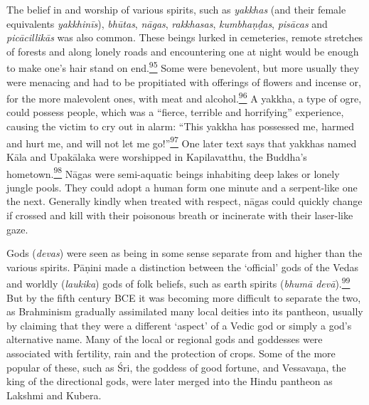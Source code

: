 The belief in and worship of various spirits, such as \emph{yakkhas}
(and their female equivalents \emph{yakkhinīs}), \emph{bhūtas},
\emph{nāgas}, \emph{rakkhasas}, \emph{kumbhaṇḍas}, \emph{pisācas} and
\emph{picācillikās} was also common. These beings lurked in cemeteries,
remote stretches of forests and along lonely roads and encountering one
at night would be enough to make one's hair stand on
end.\label{footprints_split_007.html_fnref95}\hyperref[footprints_split_024.htmlux5cux23fn95]{\textsuperscript{95}}
Some were benevolent, but more usually they were menacing and had to be
propitiated with offerings of flowers and incense or, for the more
malevolent ones, with meat and
alcohol.\label{footprints_split_007.html_fnref96}\hyperref[footprints_split_024.htmlux5cux23fn96]{\textsuperscript{96}}
A yakkha, a type of ogre, could possess people, which was a ``fierce,
terrible and horrifying'' experience, causing the victim to cry out in
alarm: ``This yakkha has possessed me, harmed and hurt me, and will not
let me
go!''\label{footprints_split_007.html_fnref97}\hyperref[footprints_split_024.htmlux5cux23fn97]{\textsuperscript{97}}
One later text says that yakkhas named Kāla and Upakālaka were
worshipped in Kapilavatthu, the Buddha's
hometown.\label{footprints_split_007.html_fnref98}\hyperref[footprints_split_024.htmlux5cux23fn98]{\textsuperscript{98}}
Nāgas were semi-aquatic beings inhabiting deep lakes or lonely jungle
pools. They could adopt a human form one minute and a serpent-like one
the next. Generally kindly when treated with respect, nāgas could
quickly change if crossed and kill with their poisonous breath or
incinerate with their laser-like gaze.

Gods (\emph{devas}) were seen as being in some sense separate from and
higher than the various spirits. Pāṇini made a distinction between the
`official' gods of the Vedas and worldly (\emph{laukika}) gods of folk
beliefs, such as earth spirits (\emph{bhumā
devā}).\label{footprints_split_007.html_fnref99}\hyperref[footprints_split_024.htmlux5cux23fn99]{\textsuperscript{99}}
But by the fifth century BCE it was becoming more difficult to separate
the two, as Brahminism gradually assimilated many local deities into its
pantheon, usually by claiming that they were a different `aspect' of a
Vedic god or simply a god's alternative name. Many of the local or
regional gods and goddesses were associated with fertility, rain and the
protection of crops. Some of the more popular of these, such as Śri, the
goddess of good fortune, and Vessavaṇa, the king of the directional
gods, were later merged into the Hindu pantheon as Lakshmi and Kubera.

